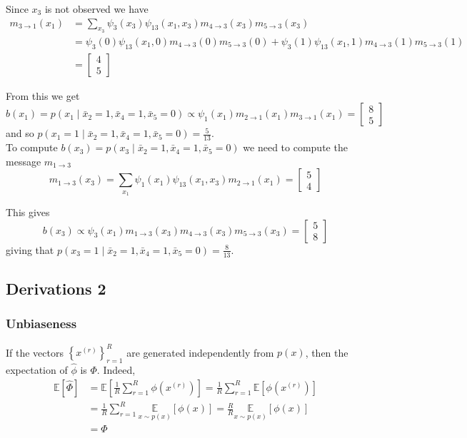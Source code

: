 Since $x_3$ is not observed we have
$$
\begin{aligned}
m_{3 \rightarrow 1}\left(x_1\right)&=\sum_{x_3} \psi_3\left(x_3\right) \psi_{13}\left(x_1, x_3\right) m_{4 \rightarrow 3}\left(x_3\right) m_{5 \rightarrow 3}\left(x_3\right)\\
&=\psi_3\left(0\right) \psi_{13}\left(x_1, 0\right) m_{4 \rightarrow 3}\left(0\right) m_{5 \rightarrow 3}\left(0\right)+\psi_3\left(1\right) \psi_{13}\left(x_1, 1\right) m_{4 \rightarrow 3}\left(1\right) m_{5 \rightarrow 3}\left(1\right)\\
&=\left[\begin{array}{l}
4 \\
5
\end{array}\right]
\end{aligned}
$$

From this we get
$$
b\left(x_1\right)=p\left(x_1 \mid \bar{x}_2=1, \bar{x}_4=1, \bar{x}_5=0\right) \propto \psi_1\left(x_1\right) m_{2 \rightarrow 1}\left(x_1\right) m_{3 \rightarrow 1}\left(x_1\right)=\left[\begin{array}{l}
8 \\
5
\end{array}\right]
$$
and so $p\left(x_1=1 \mid \bar{x}_2=1, \bar{x}_4=1, \bar{x}_5=0\right)=\frac{5}{13}$.\\
To compute $b\left(x_3\right)=p\left(x_3 \mid \bar{x}_2=1, \bar{x}_4=1, \bar{x}_5=0\right)$ we need to compute the message $m_{1 \rightarrow 3}$
$$
m_{1 \rightarrow 3}\left(x_3\right)=\sum_{x_1} \psi_1\left(x_1\right) \psi_{13}\left(x_1, x_3\right) m_{2 \rightarrow 1}\left(x_1\right)=\left[\begin{array}{l}
5 \\
4
\end{array}\right]
$$

This gives
$$
b\left(x_3\right) \propto \psi_3\left(x_1\right) m_{1 \rightarrow 3}\left(x_3\right) m_{4 \rightarrow 3}\left(x_3\right) m_{5 \rightarrow 3}\left(x_3\right)=\left[\begin{array}{l}
5 \\
8
\end{array}\right]
$$
giving that $p\left(x_3=1 \mid \bar{x}_2=1, \bar{x}_4=1, \bar{x}_5=0\right)=\frac{8}{13}$.

\subsection{Derivations 2}
\label{smc}
\subsubsection*{Unbiaseness}
If the vectors $\left\{x^{(r)}\right\}_{r=1}^R$ are generated independently from $p(x)$, then the expectation of $\hat{\phi}$ is $\Phi$. Indeed,
$$
\begin{aligned}
\mathbb{E}[\hat{\Phi}] & =\mathbb{E}\left[\frac{1}{R} \sum_{r=1}^R \phi\left(x^{(r)}\right)\right]=\frac{1}{R} \sum_{r=1}^R \mathbb{E}\left[\phi\left(x^{(r)}\right)\right] \\
& =\frac{1}{R} \sum_{r=1}^R \underset{x \sim p(x)}{\mathbb{E}}[\phi(x)]=\frac{R}{R} \underset{x \sim p(x)}{\mathbb{E}}[\phi(x)] \\
& =\Phi
\end{aligned}
$$
